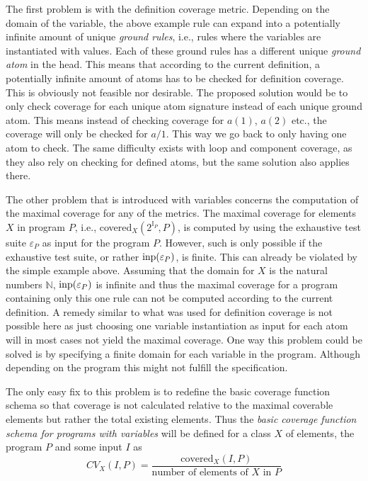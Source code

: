 The first problem is with the definition coverage metric. Depending on the domain of the variable, the above example rule can expand into a potentially infinite amount of unique \emph{ground rules}, i.e., rules where the variables are instantiated with values. Each of these ground rules has a different unique \emph{ground atom} in the head. This means that according to the current definition, a potentially infinite amount of atoms has to be checked for definition coverage. This is obviously not feasible nor desirable. The proposed solution would be to only check coverage for each unique atom signature instead of each unique ground atom. This means instead of checking coverage for $a(1)$, $a(2)$ etc., the coverage will only be checked for $a/1$. This way we go back to only having one atom to check. The same difficulty exists with loop and component coverage, as they also rely on checking for defined atoms, but the same solution also applies there.

The other problem that is introduced with variables concerns the computation of the maximal coverage for any of the metrics. The maximal coverage for elements $X$ in program $P$, i.e., covered$_X(2^{\mathbb{I}_P}, P)$, is computed by using the exhaustive test suite \(\varepsilon_P\) as input for the program $P$. However, such is only possible if the exhaustive test suite, or rather \(\operatorname{inp}(\varepsilon_P)\), is finite. This can already be violated by the simple example above. Assuming that the domain for $X$ is the natural numbers $\mathbb{N}$, \(\operatorname{inp}(\varepsilon_P)\) is infinite and thus the maximal coverage for a program containing only this one rule can not be computed according to the current definition. A remedy similar to what was used for definition coverage is not possible here as just choosing one variable instantiation as input for each atom will in most cases not yield the maximal coverage. One way this problem could be solved is by specifying a finite domain for each variable in the program. Although depending on the program this might not fulfill the specification.

The only easy fix to this problem is to redefine the basic coverage function schema so that coverage is not calculated relative to the maximal coverable elements but rather the total existing elements. Thus the \emph{basic coverage function schema for programs with variables} will be defined for a class $X$ of elements, the program $P$ and some input $I$ as
\begin{equation}
\label{eq:coverage function schema for variables}
    CV_X(I, P) = \frac{\text{covered}_X(I, P)}{\text{number of elements of $X$ in $P$}}
\end{equation}

